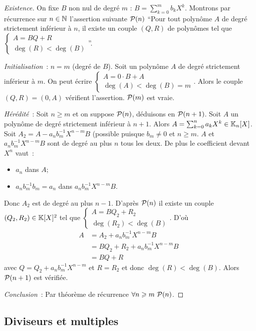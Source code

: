 \begin{proof}[Existence]
  On fixe $B$ non nul de degré $m$ : $B = \sum_{k=0}^m b_k X^k$. Montrons par récurrence sur $n \in \N$ l'assertion suivante $\P(n)$ ``Pour tout polynôme $A$ de degré strictement inférieur à $n$, il existe un couple $(Q,R)$ de polynômes tel que $\begin{cases} A=BQ+R \\ \deg(R) < \deg(B)\end{cases}$''.

  \emph{Initialisation}~: $n=m$ (degré de $B$). Soit un polynôme $A$ de degré strictement inférieur à $m$. On peut écrire $\begin{cases} A=0 \cdot B+A \\ \deg(A) < \deg(B)=m\end{cases}$. Alors le couple $(Q,R)=(0,A)$ vérifient l'assertion. $\P(m)$ est vraie.

  \emph{Hérédité}~: Soit $n \geqslant m$ et on suppose $\P(n)$, déduisons en $\P(n+1)$. Soit $A$ un polynôme de degré strictement inférieur à $n+1$. Alors $A=\sum_{k=0}^n a_k X^k \in \K_n[X]$. Soit $A_2 = A-a_nb_m^{-1}X^{n-m}B$ (possible puisque $b_m \neq 0$ et $n \geqslant m$. $A$ et $a_nb_m^{-1}X^{n-m}B$ sont de degré au plus $n$ tous les deux. De plus le coefficient devant $X^n$ vaut~:
  \begin{itemize}
  \item $a_n$ dans $A$;
  \item $a_nb_m^{-1}b_m=a_n$ dans $a_nb_m^{-1}X^{n-m}B$.
  \end{itemize}
  Donc $A_2$ est de degré au plus $n-1$. D'après $\P(n)$ il existe un couple $(Q_2,R_2) \in \K[X]^2$ tel que $\begin{cases} A=BQ_2+R_2 \\ \deg(R_2) < \deg(B)\end{cases}$. D'où
  \begin{align}
    A&=A_2 + a_n b_m^{-1}X^{n-m}B\\
    &=BQ_2+R_2 +a_n b_m^{-1}X^{n-m}B\\
    &=BQ+R
  \end{align}
  avec $Q=Q_2+a_n b_m^{-1}X^{n-m}$ et $R=R_2$ et donc $\deg(R) < \deg(B)$. Alors $\P(n+1)$ est vérifiée.

  \emph{Conclusion}~: Par théorème de récurrence $\forall n \geqslant m \ \P(n)$.
\end{proof}

\subsection{Diviseurs et multiples}

